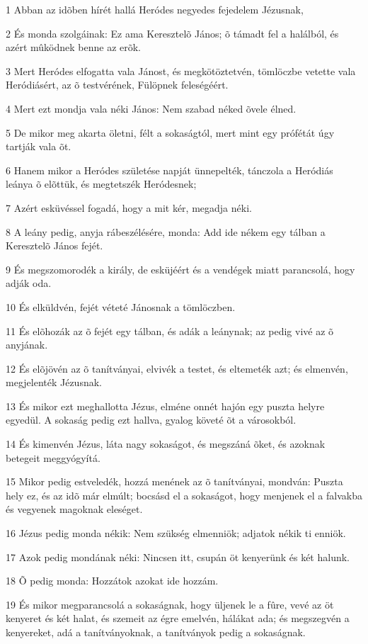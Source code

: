 \par 1 Abban az idõben hírét hallá Heródes negyedes fejedelem Jézusnak,
\par 2 És monda szolgáinak: Ez ama Keresztelõ János; õ támadt fel a halálból, és azért mûködnek benne az erõk.
\par 3 Mert Heródes elfogatta vala Jánost, és megkötöztetvén, tömlöczbe vetette vala Heródiásért, az õ testvérének, Fülöpnek feleségéért.
\par 4 Mert ezt mondja vala néki János: Nem szabad néked õvele élned.
\par 5 De mikor meg akarta öletni, félt a sokaságtól, mert mint egy prófétát úgy tartják vala õt.
\par 6 Hanem mikor a Heródes születése napját ünnepelték, tánczola a Heródiás leánya õ elõttük, és megtetszék Heródesnek;
\par 7 Azért esküvéssel fogadá, hogy a mit kér, megadja néki.
\par 8 A leány pedig, anyja rábeszélésére, monda: Add ide nékem egy tálban a Keresztelõ János fejét.
\par 9 És megszomorodék a király, de esküjéért és a vendégek miatt parancsolá, hogy adják oda.
\par 10 És elküldvén, fejét véteté Jánosnak a tömlöczben.
\par 11 És elõhozák az õ fejét egy tálban, és adák a leánynak; az pedig vivé az õ anyjának.
\par 12 És elõjövén az õ tanítványai, elvivék a testet, és eltemeték azt; és elmenvén, megjelenték Jézusnak.
\par 13 És mikor ezt meghallotta Jézus, elméne onnét hajón egy puszta helyre egyedül. A sokaság pedig ezt hallva, gyalog követé õt a városokból.
\par 14 És kimenvén Jézus, láta nagy sokaságot, és megszáná õket, és azoknak betegeit meggyógyítá.
\par 15 Mikor pedig estveledék, hozzá menének az õ tanítványai, mondván: Puszta hely ez, és az idõ már elmúlt; bocsásd el a sokaságot, hogy menjenek el a falvakba és vegyenek magoknak eleséget.
\par 16 Jézus pedig monda nékik: Nem szükség elmenniök; adjatok nékik ti enniök.
\par 17 Azok pedig mondának néki: Nincsen itt, csupán öt kenyerünk és két halunk.
\par 18 Õ pedig monda: Hozzátok azokat ide hozzám.
\par 19 És mikor megparancsolá a sokaságnak, hogy üljenek le a fûre, vevé az öt kenyeret és két halat, és szemeit az égre emelvén, hálákat ada; és megszegvén a kenyereket, adá a tanítványoknak, a tanítványok pedig a sokaságnak.
